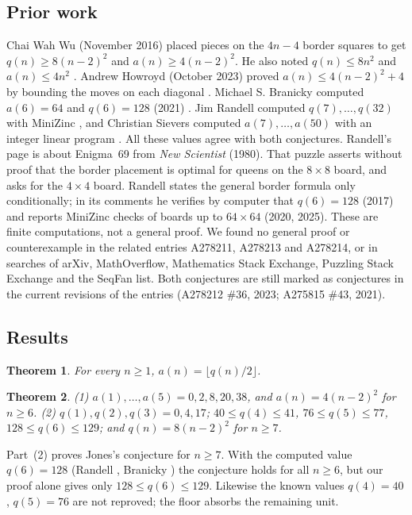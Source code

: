 \documentclass[11pt]{amsart}
\theoremstyle{plain}
\newtheorem{theorem}{Theorem}
\theoremstyle{definition}
\begin{document}
\subsection*{Prior work}
Chai Wah Wu (November 2016) placed pieces on the $4n-4$ border squares to get $q(n)\ge8(n-2)^2$ and $a(n)\ge4(n-2)^2$. He also noted $q(n)\le8n^2$ and $a(n)\le4n^2$ \cite{A275815,A278212}. Andrew Howroyd (October 2023) proved $a(n)\le4(n-2)^2+4$ by bounding the moves on each diagonal \cite{A278212}. Michael S. Branicky computed $a(6)=64$ and $q(6)=128$ (2021) \cite{A275815,A278212}. Jim Randell computed $q(7),\dots,q(32)$ with MiniZinc \cite{A275815,Randell}, and Christian Sievers computed $a(7),\dots,a(50)$ with an integer linear program \cite{A278212,A278214}. All these values agree with both conjectures. Randell's page \cite{Randell} is about Enigma~69 from \emph{New Scientist} (1980). That puzzle asserts without proof that the border placement is optimal for queens on the $8\times8$ board, and asks for the $4\times4$ board. Randell states the general border formula only conditionally; in its comments he verifies by computer that $q(6)=128$ (2017) and reports MiniZinc checks of boards up to $64\times64$ (2020, 2025). These are finite computations, not a general proof. We found no general proof or counterexample in the related entries A278211, A278213 and A278214, or in searches of arXiv, MathOverflow, Mathematics Stack Exchange, Puzzling Stack Exchange and the SeqFan list. Both conjectures are still marked as conjectures in the current revisions of the entries (A278212 \#36, 2023; A275815 \#43, 2021).

\subsection*{Results}
\begin{theorem}\label{thm:main}
For every $n\ge1$, $a(n)=\lfloor q(n)/2\rfloor$.
\end{theorem}

\begin{theorem}\label{thm:values}
\textup{(1)} $a(1),\dots,a(5)=0,2,8,20,38$, and $a(n)=4(n-2)^2$ for $n\ge6$.
\textup{(2)} $q(1),q(2),q(3)=0,4,17$; $40\le q(4)\le41$, $76\le q(5)\le77$, $128\le q(6)\le129$; and $q(n)=8(n-2)^2$ for $n\ge7$.
\end{theorem}

Part~(2) proves Jones's conjecture for $n\ge7$. With the computed value $q(6)=128$ (Randell \cite{Randell}, Branicky \cite{A275815}) the conjecture holds for all $n\ge6$, but our proof alone gives only $128\le q(6)\le129$. Likewise the known values $q(4)=40$, $q(5)=76$ are not reproved; the floor absorbs the remaining unit.
\end{document}
